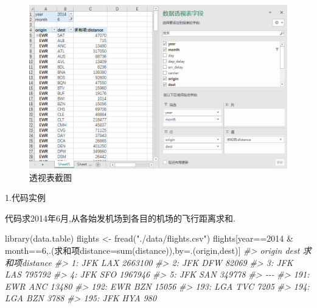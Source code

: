 \documentclass[
]{book}
\newenvironment{Shaded}{\begin{snugshade}}{\end{snugshade}}
\newcommand{\AttributeTok}[1]{\textcolor[rgb]{0.77,0.63,0.00}{#1}}
\newcommand{\CommentTok}[1]{\textcolor[rgb]{0.56,0.35,0.01}{\textit{#1}}}
\newcommand{\DecValTok}[1]{\textcolor[rgb]{0.00,0.00,0.81}{#1}}
\newcommand{\FunctionTok}[1]{\textcolor[rgb]{0.00,0.00,0.00}{#1}}
\newcommand{\NormalTok}[1]{#1}
\newcommand{\OtherTok}[1]{\textcolor[rgb]{0.56,0.35,0.01}{#1}}
\newcommand{\SpecialCharTok}[1]{\textcolor[rgb]{0.00,0.00,0.00}{#1}}
\newcommand{\StringTok}[1]{\textcolor[rgb]{0.31,0.60,0.02}{#1}}
\begin{document}
\begin{figure}
\centering
\includegraphics{./picture/chap1/01picture.png}
\caption{透视表截图}
\end{figure}

1.代码实例

代码求2014年6月,从各始发机场到各目的机场的飞行距离求和.

\begin{Shaded}
\begin{Highlighting}[]
\FunctionTok{library}\NormalTok{(data.table)}
\NormalTok{flights }\OtherTok{\textless{}{-}} \FunctionTok{fread}\NormalTok{(}\StringTok{"./data/flights.csv"}\NormalTok{)}
\NormalTok{flights[year}\SpecialCharTok{==}\DecValTok{2014} \SpecialCharTok{\&}\NormalTok{ month}\SpecialCharTok{==}\DecValTok{6}\NormalTok{,.(求和项}\AttributeTok{distance=}\FunctionTok{sum}\NormalTok{(distance)),by}\OtherTok{=}\NormalTok{.(origin,dest)]}
\CommentTok{\#\textgreater{}      origin dest 求和项distance}
\CommentTok{\#\textgreater{}   1:    JFK  LAX        2663100}
\CommentTok{\#\textgreater{}   2:    JFK  DFW          82069}
\CommentTok{\#\textgreater{}   3:    JFK  LAS         795792}
\CommentTok{\#\textgreater{}   4:    JFK  SFO        1967946}
\CommentTok{\#\textgreater{}   5:    JFK  SAN         349778}
\CommentTok{\#\textgreater{}  {-}{-}{-}                           }
\CommentTok{\#\textgreater{} 191:    EWR  ANC          13480}
\CommentTok{\#\textgreater{} 192:    EWR  BZN          15056}
\CommentTok{\#\textgreater{} 193:    LGA  TVC           7205}
\CommentTok{\#\textgreater{} 194:    LGA  BZN           3788}
\CommentTok{\#\textgreater{} 195:    JFK  HYA            980}
\end{Highlighting}
\end{Shaded}
\end{document}

